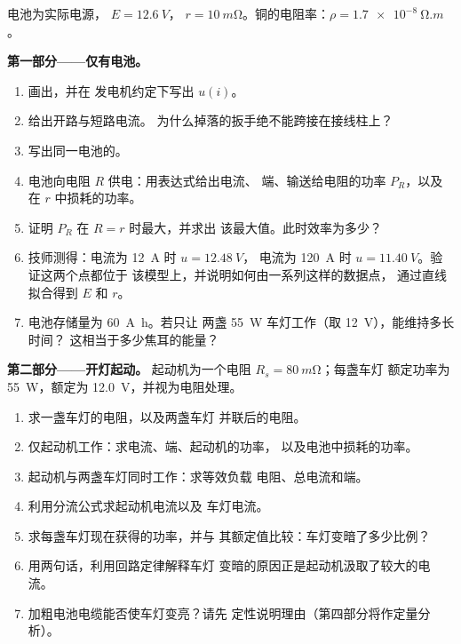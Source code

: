 \begin{problem}
\label{pb:b1:dc-circuits:1}
电池为实际电源， $E = \qty{12.6}{V}$， $r = \qty{10}{m\ohm}$。铜的电阻率：$\rho = \qty{1.7e-8}{\ohm.m}$。

\medskip
\noindent\textbf{第一部分——仅有电池。}
\begin{enumerate}
  \item 画出，并在
        发电机约定下写出 $u(i)$。
  \item 给出开路与短路电流。
        为什么掉落的扳手绝不能跨接在接线柱上？
  \item 写出同一电池的。
  \item 电池向电阻 $R$ 供电：用表达式给出电流、
        端、输送给电阻的功率 $P_R$，以及在
        $r$ 中损耗的功率。
  \item 证明 $P_R$ 在 $R = r$ 时最大，并求出
        该最大值。此时效率为多少？
  \item 技师测得：电流为 \qty{12}{A} 时 $u = \qty{12.48}{V}$，
        电流为 \qty{120}{A} 时 $u = \qty{11.40}{V}$。验证这两个点都位于
        该模型上，并说明如何由一系列这样的数据点，
        通过直线拟合得到 $E$ 和 $r$。
  \item 电池存储量为 \qty{60}{A.h}。若只让
        两盏 \qty{55}{W} 车灯工作（取 \qty{12}{V}），能维持多长时间？
        这相当于多少焦耳的能量？
\end{enumerate}

\medskip
\noindent\textbf{第二部分——开灯起动。}
起动机为一个电阻 $R_s = \qty{80}{m\ohm}$；每盏车灯
额定功率为 \qty{55}{W}，额定为 \qty{12.0}{V}，并视为电阻处理。
\begin{enumerate}[resume]
  \item 求一盏车灯的电阻，以及两盏车灯
        并联后的电阻。
  \item 仅起动机工作：求电流、端、起动机的功率，
        以及电池中损耗的功率。
  \item 起动机与两盏车灯同时工作：求等效负载
        电阻、总电流和端。
  \item 利用分流公式求起动机电流以及
        车灯电流。
  \item 求每盏车灯现在获得的功率，并与
        其额定值比较：车灯变暗了多少比例？
  \item 用两句话，利用回路定律解释车灯
        变暗的原因正是起动机汲取了较大的电流。
  \item 加粗电池电缆能否使车灯变亮？请先
        定性说明理由（第四部分将作定量分析）。
\end{enumerate}


\end{problem}
